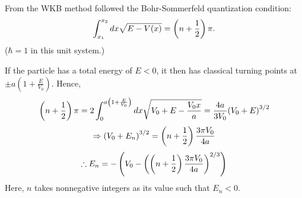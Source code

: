 \item
From the WKB method followed the Bohr-Sommerfeld quantization condition:
\[
	\int_{x_1}^{x_2} dx \sqrt{E - V(x)} = \left( n + \frac{1}{2} \right) \pi.
\]
($\hbar = 1$ in this unit system.)

If the particle has a total energy of $E < 0$, it then has classical turning points at $\pm a \left( 1 + \frac{E}{V_0} \right)$.
Hence,
\[
	\left( n + \frac{1}{2} \right) \pi
	= 2 \int_0^{a \left( 1 + \frac{E}{V_0} \right)} dx \sqrt{V_0 + E - \frac{V_0 x}{a}}
	= \frac{4a}{3V_0} {\left( V_0 + E \right)}^{3/2}
\]
\[
	\Rightarrow {\left( V_0 + E_n \right)}^{3/2} = \left( n + \frac{1}{2} \right) \frac{3\pi V_0}{4a}
\]
\[
	\therefore E_n = -\left(
		V_0 - {\left( \left( n + \frac{1}{2} \right) \frac{3\pi V_0}{4a} \right)}^{2/3}
	\right)
\]
Here, $n$ takes nonnegative integers as its value such that $E_n < 0$.